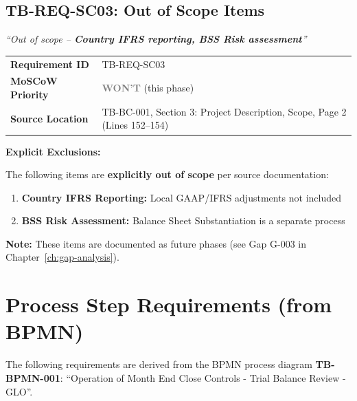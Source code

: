 \documentclass[11pt,a4paper,twoside]{report}
\begin{document}
\subsection{TB-REQ-SC03: Out of Scope Items}
\label{req:tb-req-sc03}

\begin{tcolorbox}[colback=sourcegreen!5,colframe=sourcegreen!70,title=Source Quotation]
\textit{``Out of scope – \textbf{Country IFRS reporting, BSS Risk assessment}''}
\end{tcolorbox}

\begin{tabularx}{\textwidth}{@{}lX@{}}
\toprule
\textbf{Requirement ID} & TB-REQ-SC03 \\
\textbf{MoSCoW Priority} & \textcolor{gray}{\textbf{WON'T}} (this phase) \\
\textbf{Source Location} & TB-BC-001, Section 3: Project Description, Scope, Page 2 (Lines 152--154) \\
\bottomrule
\end{tabularx}

\vspace{0.5em}
\textbf{Explicit Exclusions:}

The following items are \textbf{explicitly out of scope} per source documentation:

\begin{enumerate}
\item \textbf{Country IFRS Reporting:} Local GAAP/IFRS adjustments not included
\item \textbf{BSS Risk Assessment:} Balance Sheet Substantiation is a separate process
\end{enumerate}

\textbf{Note:} These items are documented as future phases (see Gap G-003 in Chapter~\ref{ch:gap-analysis}).

\section{Process Step Requirements (from BPMN)}
\label{sec:req-process}

The following requirements are derived from the BPMN process diagram
\textbf{TB-BPMN-001}: ``Operation of Month End Close Controls - Trial Balance
Review - GLO''.
\end{document}
